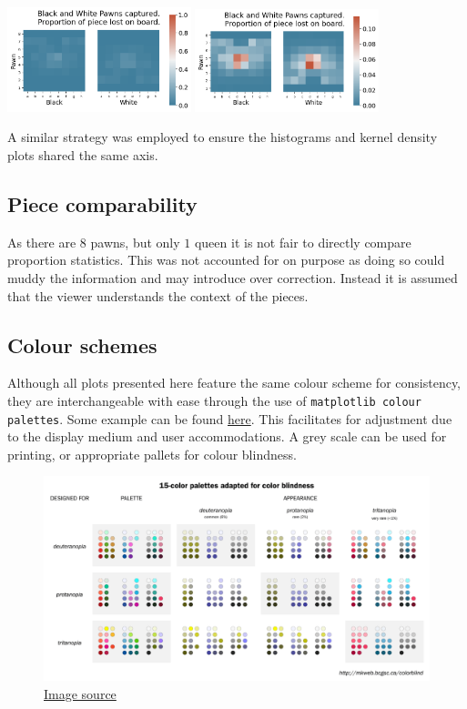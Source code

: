 \documentclass[11pt]{article}
\begin{document}
\begin{center}
\includegraphics[width=0.4\textwidth]{Images/DaenaliaEvandruile_HEATMAP_Pawn_WHITE_EXAMPLE_1_WITH_WRONG_COLOUR.png}
\includegraphics[width=0.4\textwidth]{Images/_HEATMAP_Pawn_FISC.png}
\end{center}
A similar strategy was employed to ensure the histograms and kernel density plots shared the same axis.

\newpage
\subsection{Piece comparability}
\label{sec:org5966663}
As there are \(8\) pawns, but only \(1\) queen it is not fair to directly compare proportion statistics. This was not accounted for on purpose as doing so could muddy the information and may introduce over correction. Instead it is assumed that the viewer understands the context of the pieces.
\subsection{Colour schemes}
\label{sec:org26bd7e8}
Although all plots presented here feature the same colour scheme for consistency, they are interchangeable with ease through the use of \texttt{matplotlib colour palettes}. Some example can be found \href{https://seaborn.pydata.org/tutorial/color\_palettes.html}{here}. This facilitates for adjustment due to the display medium and user accommodations. A grey scale can be used for printing, or appropriate pallets for colour blindness.

\begin{figure}[htbp]
\centering
\includegraphics[width=\textwidth]{Images/color-blind-friendly-palette-9.png}
\caption{\href{https://mkweb.bcgsc.ca/colorblind/}{Image source}}
\end{figure}
\end{document}
